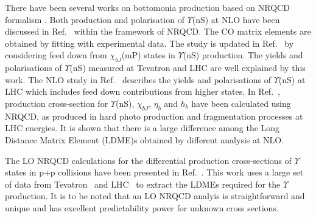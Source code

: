 There have been several works on bottomonia production based on
NRQCD formalism \cite{Domenech:1999qg,Domenech:2000ri,Braaten:2000cm,Gong:2010bk,Sharma:2012dy}.
Both production and polarisation of $\Upsilon$(nS) at NLO have been discussed in 
Ref.~\cite{Gong:2013qka} within the framework of NRQCD. The CO matrix elements are obtained
by fitting with experimental data. The study is updated in Ref.~\cite{Feng:2015wka} by considering
feed down from $\chi_{bJ}$(mP) states in $\Upsilon$(nS) production. The yields and
polarisations of $\Upsilon$(nS) measured at Tevatron and LHC are well explained by this work.
The NLO study in Ref.~\cite{Han:2014kxa} describes the yields and polarisations of
$\Upsilon$(nS) at LHC which includes feed down contributions from
higher states. In Ref.~\cite{Yu:2017pot}, production cross-section for $\Upsilon$(nS),
$\chi_{bJ}$, $\eta_b$ and $h_b$ have been calculated using NRQCD, as produced in hard
photo production and fragmentation processes at LHC energies. 
It is shown that there is a large difference among the Long Distance Matrix Element (LDME)s obtained by different
analysis at NLO.

The LO NRQCD calculations for the differential production
cross-sections of $\Upsilon$ states in p+p collisions have been presented
in Ref.~\cite{Kumar:2021sek}.
This work uses a large set of data from Tevatron~\cite{Acosta:2001gv} and
LHC~\cite{Chatrchyan:2013yna,LHCb:2012aa,Khachatryan:2015qpa,Aad:2012dlq,Sirunyan:2017qdw} 
to extract the LDMEs required for the $\Upsilon$ production.
It is to be noted that an LO NRQCD analyis is straightforward and unique and has excellent
predictability power for unknown cross sections.


